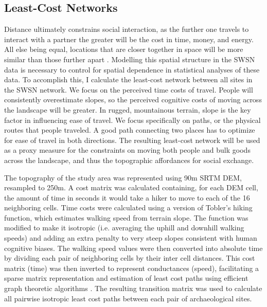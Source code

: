 \documentclass[10pt]{iopart}
\begin{document}
\subsection*{Least-Cost Networks}
Distance ultimately constrains social interaction, as the further one travels to interact with a partner the greater will be the cost in time, money, and energy. All else being equal, locations that are closer together in space will be more similar than those further apart \parencite{Tobler1970}. Modelling this spatial structure in the SWSN data is necessary to control for spatial dependence in statistical analyses of these data. To accomplish this, I calculate the least-cost network between all sites in the SWSN network. We focus on the perceived time costs of travel. People will consistently overestimate slopes, so the perceived cognitive costs of moving across the landscape will be greater. In rugged, mountainous terrain, slope is the key factor in influencing ease of travel. We focus specifically on paths, or the physical routes that people traveled. A good path connecting two places has to optimize for ease of travel in both directions. The resulting least-cost network will be used as a proxy measure for the constraints on moving both people and bulk goods across the landscape, and thus the topographic affordances for social exchange.

The topography of the study area was represented using 90m SRTM DEM, resampled to 250m. A cost matrix was calculated containing, for each DEM cell, the amount of time in seconds it would take a hiker to move to each of the 16 neighboring cells. Time costs were calculated using a version of Tobler's hiking function, which estimates walking speed from terrain slope. The function was modified to make it isotropic (i.e. averaging the uphill and downhill walking speeds) and adding an extra penalty to very steep slopes consistent with human cognitive biases. The walking speed values were then converted into absolute time by dividing each pair of neighboring cells by their inter cell distances. This cost matrix (time) was then inverted to represent conductances (speed), facilitating a sparse matrix representation and estimation of least cost paths using efficient graph theoretic algorithms \parencite{vanetten2014}. The resulting transition matrix was used to calculate all pairwise isotropic least cost paths between each pair of archaeological sites. 
\end{document}
